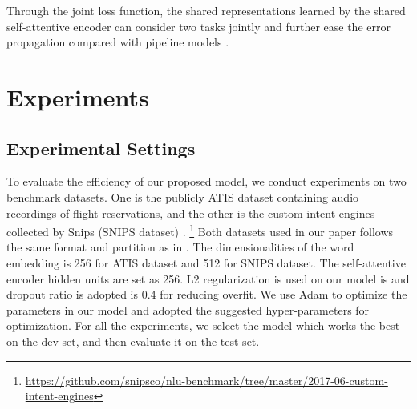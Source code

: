 \documentclass[11pt,a4paper]{article}
\begin{document}
Through the joint loss function, the shared 
representations learned by the shared self-attentive encoder can 
consider two tasks jointly and further ease the error propagation compared with pipeline models \cite{zhang2016joint}. 

\section{Experiments}
\subsection{Experimental Settings}
To evaluate the efficiency of our proposed model, we 
conduct experiments on two benchmark datasets. One
is the publicly ATIS dataset \cite{hemphill1990atis} 
containing audio recordings of flight reservations, and the other is the custom-intent-engines
collected by Snips (SNIPS dataset) \cite{coucke2018snips}.
\footnote{\url{https://github.com/snipsco/nlu-benchmark/tree/master/2017-06-custom-intent-engines}}
Both datasets used in 
our paper follows the same format and partition as in . 
The dimensionalities of the word embedding is 256 for ATIS dataset and 512 for SNIPS dataset. The self-attentive encoder
hidden units are set as 256. L2 regularization is used 
on our model is  and dropout ratio
is adopted is 0.4 for reducing overfit.
We use Adam \cite{kingma-ba:2014:ICLR} to 
optimize the parameters in our model and adopted 
the suggested hyper-parameters for optimization. 
For all the experiments, we select the model which works the best on the dev set, and then evaluate it on the test set.
\end{document}
